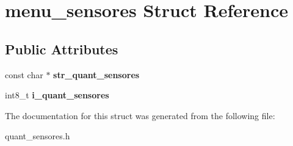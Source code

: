 \hypertarget{structmenu__sensores}{\section{menu\-\_\-sensores \-Struct \-Reference}
\label{structmenu__sensores}
}
\subsection*{\-Public \-Attributes}
\begin{DoxyCompactItemize}
\item 
\hypertarget{structmenu__sensores_a53d88c8cc7af1221bb4d29fe43ddb018}{const char $\ast$ {\bfseries str\-\_\-quant\-\_\-sensores}}\label{structmenu__sensores_a53d88c8cc7af1221bb4d29fe43ddb018}

\item 
\hypertarget{structmenu__sensores_a54b3e8f65e2931791e29ab4642e6ccdc}{int8\-\_\-t {\bfseries i\-\_\-quant\-\_\-sensores}}\label{structmenu__sensores_a54b3e8f65e2931791e29ab4642e6ccdc}

\end{DoxyCompactItemize}


\-The documentation for this struct was generated from the following file\-:\begin{DoxyCompactItemize}
\item 
quant\-\_\-sensores.\-h\end{DoxyCompactItemize}
